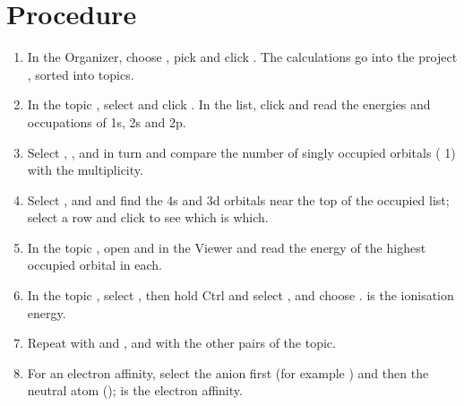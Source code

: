 

\section{Procedure}
\begin{enumerate}
	\item In the Organizer, choose , pick  and click . The calculations go into the project , sorted into topics.
	\item In the topic , select  and click . In the  list, click  and read the energies and occupations of 1s, 2s and 2p.
	\item Select , ,  and  in turn and compare the number of singly occupied orbitals ( 1) with the multiplicity.
	\item Select ,  and  and find the 4s and 3d orbitals near the top of the occupied list; select a row and click  to see which is which.
	\item In the topic , open  and  in the Viewer and read the energy of the highest occupied orbital in each.
	\item In the topic , select , then hold Ctrl and select , and choose .  is the ionisation energy.
	\item Repeat with  and , and with the other pairs of the topic.
	\item For an electron affinity, select the anion first (for example ) and then the neutral atom ();  is the electron affinity.
\end{enumerate}

